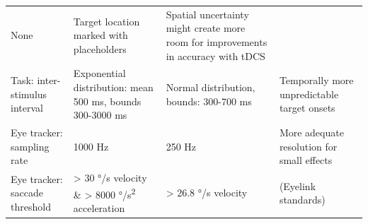 \documentclass[11pt,]{memoir}
\begin{document}
\begin{longtable}[]{@{}llll@{}}
\begin{minipage}[t]{0.21\columnwidth}
None\strut
\end{minipage} & \begin{minipage}[t]{0.16\columnwidth}\raggedright
Target location marked with placeholders\strut
\end{minipage} & \begin{minipage}[t]{0.38\columnwidth}\raggedright
Spatial uncertainty might create more room for improvements in accuracy with tDCS\strut
\end{minipage}\tabularnewline
\begin{minipage}[t]{0.14\columnwidth}\raggedright
Task: inter-stimulus interval\strut
\end{minipage} & \begin{minipage}[t]{0.21\columnwidth}\raggedright
Exponential distribution: mean 500 ms, bounds 300-3000 ms\strut
\end{minipage} & \begin{minipage}[t]{0.16\columnwidth}\raggedright
Normal distribution, bounds: 300-700 ms\strut
\end{minipage} & \begin{minipage}[t]{0.38\columnwidth}\raggedright
Temporally more unpredictable target onsets\strut
\end{minipage}\tabularnewline
\begin{minipage}[t]{0.14\columnwidth}\raggedright
Eye tracker: sampling rate\strut
\end{minipage} & \begin{minipage}[t]{0.21\columnwidth}\raggedright
1000 Hz\strut
\end{minipage} & \begin{minipage}[t]{0.16\columnwidth}\raggedright
250 Hz\strut
\end{minipage} & \begin{minipage}[t]{0.38\columnwidth}\raggedright
More adequate resolution for small effects\strut
\end{minipage}\tabularnewline
\begin{minipage}[t]{0.14\columnwidth}\raggedright
Eye tracker: saccade threshold\strut
\end{minipage} & \begin{minipage}[t]{0.21\columnwidth}\raggedright
\textgreater{} 30 °/s velocity \& \textgreater{} 8000 °/s\textsuperscript{2} acceleration\strut
\end{minipage} & \begin{minipage}[t]{0.16\columnwidth}\raggedright
\textgreater{} 26.8 °/s velocity\strut
\end{minipage} & \begin{minipage}[t]{0.38\columnwidth}\raggedright
(Eyelink standards)\strut
\end{minipage}\tabularnewline
\bottomrule
\end{longtable}
\end{document}
